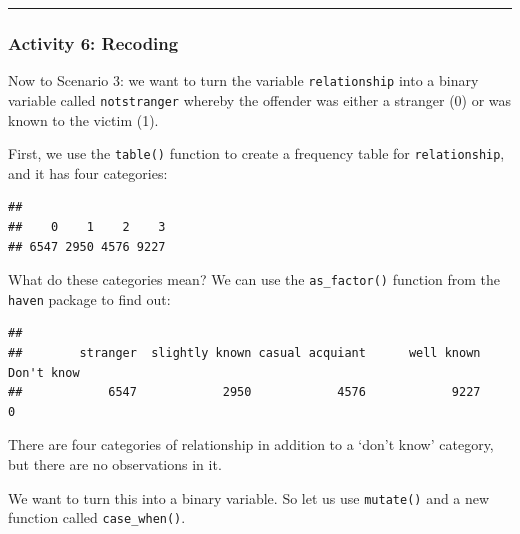 \documentclass[
]{book}
\newenvironment{Shaded}{\begin{snugshade}}{\end{snugshade}}
\newcommand{\FunctionTok}[1]{\textcolor[rgb]{0.00,0.00,0.00}{#1}}
\newcommand{\NormalTok}[1]{#1}
\newcommand{\SpecialCharTok}[1]{\textcolor[rgb]{0.00,0.00,0.00}{#1}}
\begin{document}
\begin{center}\rule{0.5\linewidth}{0.5pt}\end{center}

\hypertarget{activity-6-recoding}{%
\subsubsection{Activity 6: Recoding}\label{activity-6-recoding}}

Now to Scenario 3: we want to turn the variable \texttt{relationship} into a binary variable called \texttt{notstranger} whereby the offender was either a stranger (0) or was known to the victim (1).

First, we use the \texttt{table()} function to create a frequency table for \texttt{relationship}, and it has four categories:

\begin{Shaded}
\end{Shaded}

\begin{verbatim}
## 
##    0    1    2    3 
## 6547 2950 4576 9227
\end{verbatim}

What do these categories mean? We can use the \texttt{as\_factor()} function from the \texttt{haven} package to find out:

\begin{Shaded}
\end{Shaded}

\begin{verbatim}
## 
##        stranger  slightly known casual acquiant      well known      Don't know 
##            6547            2950            4576            9227               0
\end{verbatim}

There are four categories of relationship in addition to a `don't know' category, but there are no observations in it.

We want to turn this into a binary variable. So let us use \texttt{mutate()} and a new function called \texttt{case\_when()}.
\end{document}
